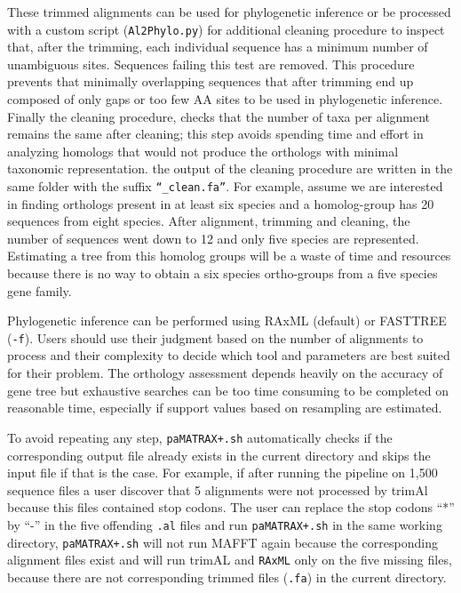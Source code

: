 \documentclass[10pt]{article}
\begin{document}
These trimmed alignments can be used for phylogenetic inference or be
processed with a custom script (\texttt{Al2Phylo.py}) for additional
cleaning procedure to inspect that, after the trimming, each
individual sequence has a minimum number of unambiguous
sites. Sequences failing this test are removed. This procedure
prevents that minimally overlapping sequences that after trimming end
up composed of only gaps or too few AA sites to be used in
phylogenetic inference. Finally the cleaning procedure, checks that
the number of taxa per alignment remains the same after cleaning; this
step avoids spending time and effort in analyzing homologs that would
not produce the orthologs with minimal taxonomic representation. the
output of the cleaning procedure are written in the same folder with
the suffix \texttt{``\_clean.fa''}. For example, assume we are
interested in finding orthologs present in at least six species and a
homolog-group has 20 sequences from eight species. After alignment,
trimming and cleaning, the number of sequences went down to 12 and
only five species are represented. Estimating a tree from this homolog
groups will be a waste of time and resources because there is no way
to obtain a six species ortho-groups from a five species gene family.

Phylogenetic inference can be performed using RAxML (default) or
FASTTREE (\texttt{-f}). Users should use their judgment based on the
number of alignments to process and their complexity to decide which
tool and parameters are best suited for their problem. The orthology
assessment depends heavily on the accuracy of gene tree but exhaustive
searches can be too time consuming to be completed on reasonable time,
especially if support values based on resampling are estimated.

To avoid repeating any step, \texttt{paMATRAX+.sh} automatically checks
if the corresponding  output file already exists in the current directory and skips
the input file if that is the case. For example, if after running the
pipeline on 1,500 sequence files a user discover that 5 alignments were not
processed by trimAl because this files contained stop codons. The user can replace the stop codons ``*'' by ``-'' in the five offending
\texttt{.al} files and run \texttt{paMATRAX+.sh} in the same working directory,
\texttt{paMATRAX+.sh} will not run MAFFT again because the
corresponding alignment files exist and will run trimAL and \texttt{RAxML} only on the
five missing files, because there are not corresponding trimmed files
(\texttt{.fa}) in the current directory.
\end{document}
